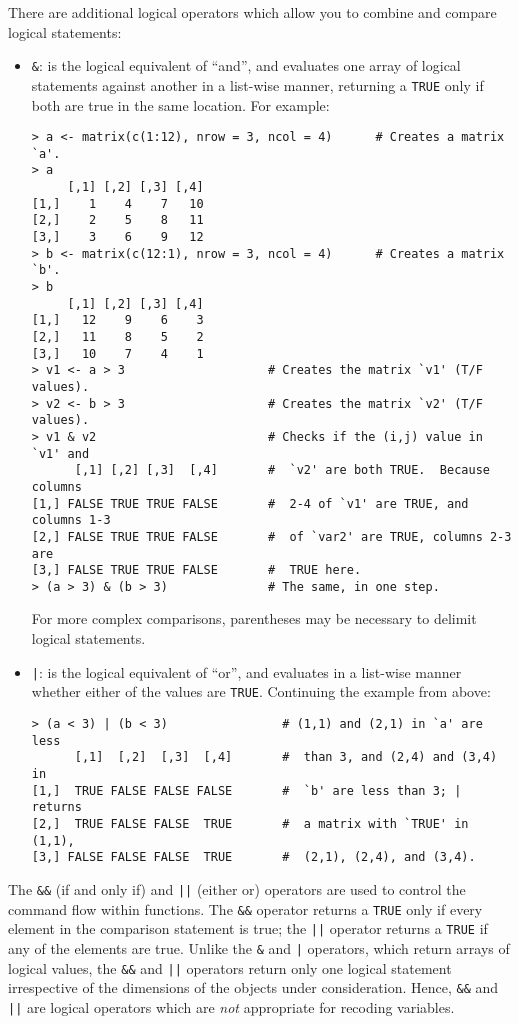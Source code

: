 There are additional logical operators which allow you to combine and
compare logical statements:
\begin{itemize}
\item {\tt \&}: is the logical equivalent of ``and'', and evaluates
one array of logical statements against another in a list-wise manner,
returning a {\tt TRUE} only if both are true in the same location.  For example:
\begin{verbatim}
> a <- matrix(c(1:12), nrow = 3, ncol = 4)      # Creates a matrix `a'.  
> a
     [,1] [,2] [,3] [,4]
[1,]    1    4    7   10
[2,]    2    5    8   11
[3,]    3    6    9   12
> b <- matrix(c(12:1), nrow = 3, ncol = 4)      # Creates a matrix `b'.  
> b
     [,1] [,2] [,3] [,4]
[1,]   12    9    6    3
[2,]   11    8    5    2
[3,]   10    7    4    1
> v1 <- a > 3                    # Creates the matrix `v1' (T/F values). 
> v2 <- b > 3                    # Creates the matrix `v2' (T/F values). 
> v1 & v2                        # Checks if the (i,j) value in `v1' and 
      [,1] [,2] [,3]  [,4]       #  `v2' are both TRUE.  Because columns 
[1,] FALSE TRUE TRUE FALSE       #  2-4 of `v1' are TRUE, and columns 1-3
[2,] FALSE TRUE TRUE FALSE       #  of `var2' are TRUE, columns 2-3 are
[3,] FALSE TRUE TRUE FALSE       #  TRUE here.  
> (a > 3) & (b > 3)              # The same, in one step.  
\end{verbatim}
  For more complex comparisons, parentheses may be necessary to
  delimit logical statements.
  
\item {\tt |}: is the logical equivalent of ``or'', and evaluates in a
list-wise manner whether either of the
  values are {\tt TRUE}.  Continuing the example from above:
\begin{verbatim}
> (a < 3) | (b < 3)                # (1,1) and (2,1) in `a' are less
      [,1]  [,2]  [,3]  [,4]       #  than 3, and (2,4) and (3,4) in
[1,]  TRUE FALSE FALSE FALSE       #  `b' are less than 3; | returns
[2,]  TRUE FALSE FALSE  TRUE       #  a matrix with `TRUE' in (1,1),
[3,] FALSE FALSE FALSE  TRUE       #  (2,1), (2,4), and (3,4).  
\end{verbatim}
\end{itemize}
The {\tt \&\&} (if and only if) and {\tt ||} (either or) operators are
used to control the command flow within functions.  The {\tt \&\&}
operator returns a {\tt TRUE} only if every element in the comparison
statement is true; the {\tt ||} operator returns a {\tt TRUE} if any
of the elements are true.  Unlike the {\tt \&} and {\tt |} operators,
which return arrays of logical values, the {\tt \&\&} and {\tt ||}
operators return only one logical statement irrespective of the
dimensions of the objects under consideration.  Hence, {\tt \&\&} and
{\tt ||} are logical operators which are \emph{not} appropriate for
recoding variables.

